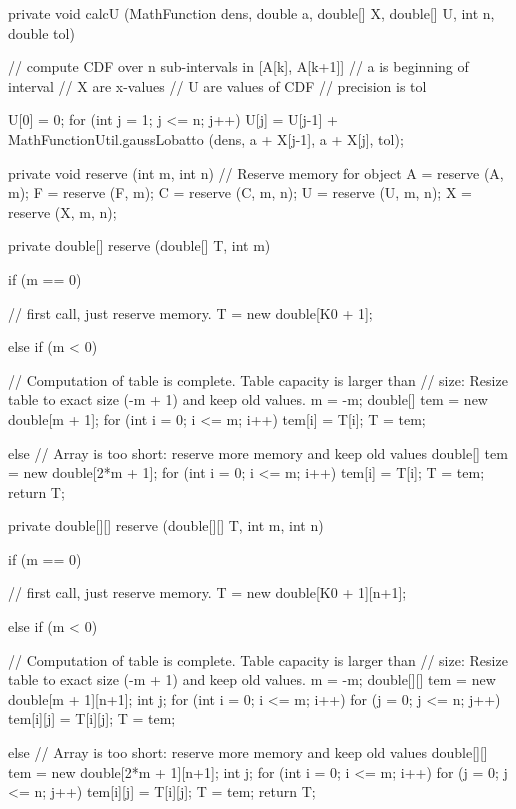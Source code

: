 \begin{hide}
\begin{code}
   private void calcU (MathFunction dens, double a, double[] X, double[] U,
                       int n, double tol) {
      // compute CDF over n sub-intervals in [A[k], A[k+1]]
      // a is beginning of interval
      // X are x-values
      // U are values of CDF
      // precision is tol

      U[0] = 0;
      for (int j = 1; j <= n; j++)
         U[j] = U[j-1] +
            MathFunctionUtil.gaussLobatto (dens, a + X[j-1], a + X[j], tol);
   }


   private void reserve (int m, int n) {
      // Reserve memory for object
      A = reserve (A, m);
      F = reserve (F, m);
      C = reserve (C, m, n);
      U = reserve (U, m, n);
      X = reserve (X, m, n);
   }


   private double[] reserve (double[] T, int m) {
      if (m == 0) {
         // first call, just reserve memory.
         T = new double[K0 + 1];

      } else if (m < 0) {
         // Computation of table is complete. Table capacity is larger than
         // size: Resize table to exact size (-m + 1) and keep old values.
         m = -m;
         double[] tem = new double[m + 1];
         for (int i = 0; i <= m; i++)
            tem[i] = T[i];
         T = tem;

      } else {
         // Array is too short: reserve more memory and keep old values
         double[] tem = new double[2*m + 1];
         for (int i = 0; i <= m; i++)
            tem[i] = T[i];
         T = tem;
      }
      return T;
   }


   private double[][] reserve (double[][] T, int m, int n) {
      if (m == 0) {
         // first call, just reserve memory.
         T = new double[K0 + 1][n+1];

      } else if (m < 0) {
         // Computation of table is complete. Table capacity is larger than
         // size: Resize table to exact size (-m + 1) and keep old values.
         m = -m;
         double[][] tem = new double[m + 1][n+1];
         int j;
         for (int i = 0; i <= m; i++) {
            for (j = 0; j <= n; j++)
               tem[i][j] = T[i][j];
         }
         T = tem;

         } else {
         // Array is too short: reserve more memory and keep old values
         double[][] tem = new double[2*m + 1][n+1];
         int j;
         for (int i = 0; i <= m; i++) {
            for (j = 0; j <= n; j++)
               tem[i][j] = T[i][j];
         }
         T = tem;
      }
      return T;
   }



\end{code}
\end{hide}
